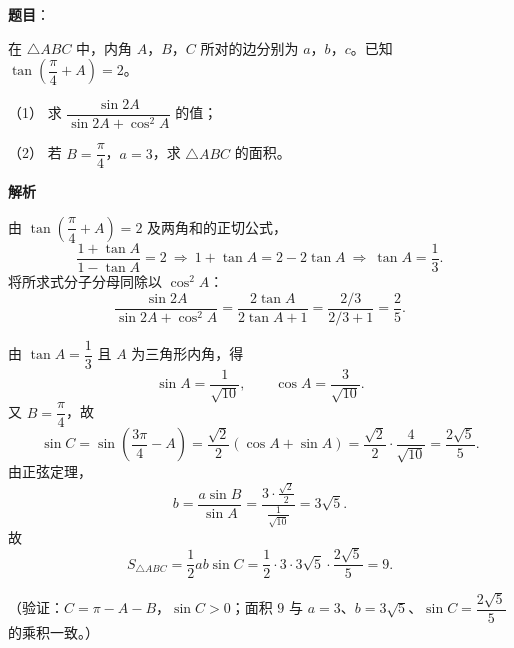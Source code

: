 \begin{answer}

\textbf{题目}：

在 \(\triangle ABC\) 中，内角 \(A\)，\(B\)，\(C\) 所对的边分别为 \(a\)，\(b\)，\(c\)。已知 \(\tan\left(\dfrac{\pi}{4}+A\right)=2\)。

（1） 求 \(\dfrac{\sin 2A}{\sin 2A+\cos^2A}\) 的值；

（2） 若 \(B=\dfrac{\pi}{4}\)，\(a=3\)，求 \(\triangle ABC\) 的面积。

\textbf{解析}


由 \(\tan\left(\dfrac{\pi}{4}+A\right)=2\) 及两角和的正切公式，
\nopagebreak[4]
\[
\frac{1+\tan A}{1-\tan A}=2
\ \Longrightarrow\ 1+\tan A=2-2\tan A
\ \Longrightarrow\ \tan A=\frac13.
\]
将所求式分子分母同除以 \(\cos^2A\)：
\nopagebreak[4]
\[
\frac{\sin2A}{\sin2A+\cos^2A}
=\frac{2\tan A}{2\tan A+1}
=\frac{2/3}{2/3+1}
=\frac25.
\]


由 \(\tan A=\dfrac13\) 且 \(A\) 为三角形内角，得
\nopagebreak[4]
\[
\sin A=\frac{1}{\sqrt{10}},\qquad \cos A=\frac{3}{\sqrt{10}}.
\]
又 \(B=\dfrac{\pi}{4}\)，故
\nopagebreak[4]
\[
\sin C=\sin\left(\frac{3\pi}{4}-A\right)
=\frac{\sqrt2}{2}(\cos A+\sin A)
=\frac{\sqrt2}{2}\cdot\frac{4}{\sqrt{10}}
=\frac{2\sqrt5}{5}.
\]
由正弦定理，
\nopagebreak[4]
\[
b=\frac{a\sin B}{\sin A}
=\frac{3\cdot\frac{\sqrt2}{2}}{\frac{1}{\sqrt{10}}}
=3\sqrt5.
\]
故
\nopagebreak[4]
\[
S_{\triangle ABC}=\frac12ab\sin C
=\frac12\cdot3\cdot3\sqrt5\cdot\frac{2\sqrt5}{5}=9.
\]

（验证：\(C=\pi-A-B\)，\(\sin C>0\)；面积 \(9\) 与 \(a=3\)、\(b=3\sqrt5\)、\(\sin C=\dfrac{2\sqrt5}{5}\) 的乘积一致。）



\end{answer}
